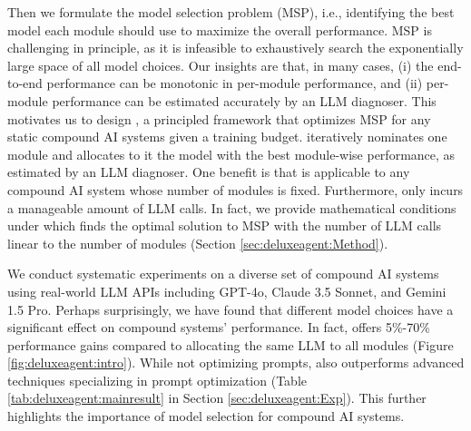 Then we formulate the model selection problem (MSP), i.e., identifying the best model each module should use to maximize the overall performance. MSP is challenging in principle, as it is infeasible to exhaustively search the exponentially large space of all model choices. Our insights are that, in many cases, (i) the end-to-end performance can be monotonic in per-module performance, and (ii) per-module performance can be estimated accurately by an LLM diagnoser. This motivates us to design \deluxesystem{}, a principled framework that optimizes MSP for any static compound AI systems given a training budget. \deluxesystem{} iteratively nominates one module and allocates to it the model with the best module-wise performance, as estimated by an LLM diagnoser. One benefit is that \deluxesystem{} is applicable to any compound AI system whose number of modules is fixed. Furthermore, \deluxesystem{} only incurs a manageable amount of LLM calls. In fact, we provide mathematical conditions under which \deluxesystem{} finds the optimal solution to MSP with the number of LLM calls linear to the number of modules (Section \ref{sec:deluxeagent:Method}). 

We conduct systematic experiments on a diverse set of compound AI systems using real-world LLM APIs including GPT-4o, Claude 3.5 Sonnet, and Gemini 1.5 Pro. Perhaps surprisingly, we have found that different model choices have a significant effect on compound systems' performance. In fact, \deluxesystem{} offers 5\%-70\% performance gains compared to allocating the same LLM to all modules (Figure \ref{fig:deluxeagent:intro}). While not optimizing prompts, \deluxesystem{} also outperforms advanced techniques specializing in prompt optimization (Table \ref{tab:deluxeagent:mainresult} in Section \ref{sec:deluxeagent:Exp}). This further highlights the importance of model selection for compound AI systems. 


